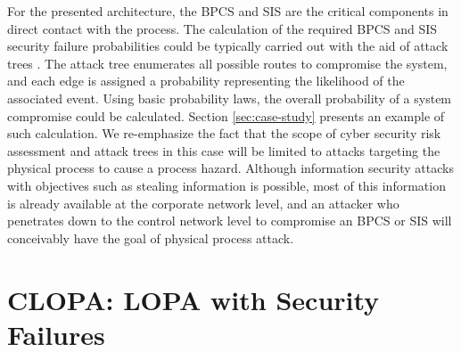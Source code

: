 \documentclass[journal]{IEEEtran}
\begin{document}
For the presented architecture, the BPCS and SIS are the critical components in direct contact with the process. The calculation of the required BPCS and SIS security failure probabilities could be typically carried out with the aid of attack trees \cite{Moore2001}. The attack tree enumerates all possible routes to compromise the system, and each edge is assigned a probability representing the likelihood of the associated event. Using basic probability laws, the overall probability of a system compromise could be calculated. Section \ref{sec:case-study} presents an example of such calculation. We re-emphasize the fact that the scope of cyber security risk assessment and attack trees in this case will be limited to attacks targeting the physical process to cause a process hazard. Although information security attacks with objectives such as stealing information is possible, most of this information is already available at the corporate network level, and an attacker who penetrates down to the control network level to compromise an BPCS or SIS will conceivably have the goal of physical process attack. 

\section{CLOPA: LOPA with Security Failures} \label{sec:CLOPA}
\end{document}
